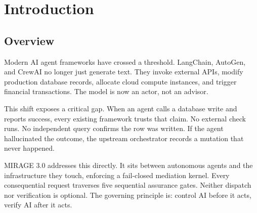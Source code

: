 \documentclass[12pt,a4paper]{report}
\numberwithin{equation}{section}
\begin{document}
\newpage

\tableofcontents
\newpage
\listoffigures
\newpage
\listoftables
\newpage

\setcounter{page}{1}
\pagestyle{fancy}

\chapter{Introduction}

\section{Overview}
Modern AI agent frameworks have crossed a threshold. LangChain, AutoGen, and CrewAI no longer just generate text. They invoke external APIs, modify production database records, allocate cloud compute instances, and trigger financial transactions. The model is now an actor, not an advisor.

This shift exposes a critical gap. When an agent calls a database write and reports success, every existing framework trusts that claim. No external check runs. No independent query confirms the row was written. If the agent hallucinated the outcome, the upstream orchestrator records a mutation that never happened.

MIRAGE 3.0 addresses this directly. It sits between autonomous agents and the infrastructure they touch, enforcing a fail-closed mediation kernel. Every consequential request traverses five sequential assurance gates. Neither dispatch nor verification is optional. The governing principle is: control AI before it acts, verify AI after it acts.
\end{document}
